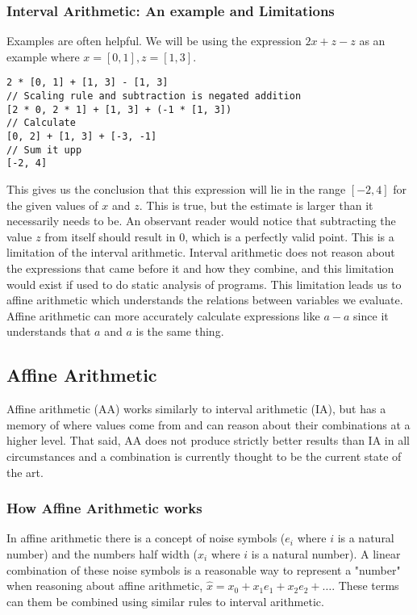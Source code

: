 \subsubsection{Interval Arithmetic: An example and Limitations}
Examples are often helpful.
We will be using the expression $2x + z - z$ as an example where $x = [0, 1], z = [1, 3]$.

\begin{verbatim}
2 * [0, 1] + [1, 3] - [1, 3]
// Scaling rule and subtraction is negated addition 
[2 * 0, 2 * 1] + [1, 3] + (-1 * [1, 3])
// Calculate
[0, 2] + [1, 3] + [-3, -1]
// Sum it upp
[-2, 4]
\end{verbatim}

This gives us the conclusion that this expression will lie in the range $[-2, 4]$ for the given values of $x$ and $z$. This is true, but the estimate is larger than it necessarily needs to be. An observant reader would notice that subtracting the value $z$ from itself should result in $0$, which is a perfectly valid point. This is a limitation of the interval arithmetic. Interval arithmetic does not reason about the expressions that came before it and how they combine, and this limitation would exist if used to do static analysis of programs. This limitation leads us to affine arithmetic which understands the relations between variables we evaluate. Affine arithmetic can more accurately calculate expressions like $a - a$ since it understands that $a$ and $a$ is the same thing.


\subsection{Affine Arithmetic}
Affine arithmetic (AA) works similarly to interval arithmetic (IA), but has a memory of where values come from and can reason about their combinations at a higher level. That said, AA does not produce strictly better results than IA in all circumstances and a combination is currently thought to be the current state of the art. 

\subsubsection{How Affine Arithmetic works}
In affine arithmetic there is a concept of noise symbols ($e_i$ where $i$ is a natural number) and the numbers half width ($x_i$ where $i$ is a natural number). A linear combination of these noise symbols is a reasonable way to represent a "number" when reasoning about affine arithmetic, $\hat{x} = x_0 + x_1e_1 + x_2e_2 + \dots$. These terms can them be combined using similar rules to interval arithmetic.

